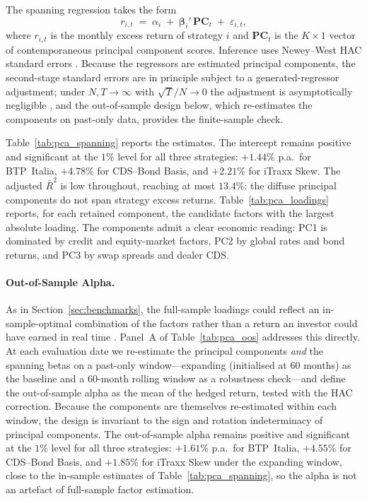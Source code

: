 The spanning regression takes the form
\[
r_{i,t} \;=\; \alpha_i \;+\; \boldsymbol{\beta}_i'\,
\mathbf{PC}_t \;+\; \varepsilon_{i,t},
\]
where $r_{i,t}$ is the monthly excess return of strategy $i$ and
$\mathbf{PC}_t$ is the $K \times 1$ vector of contemporaneous
principal component scores. Inference uses Newey--West HAC standard
errors \citep{newey1987simple}. Because the regressors are estimated
principal components, the second-stage standard errors are in
principle subject to a generated-regressor adjustment; under
$N, T \to \infty$ with $\sqrt{T}/N \to 0$ the adjustment is
asymptotically negligible \citep{bai2006confidence}, and the
out-of-sample design below, which re-estimates the components on
past-only data, provides the finite-sample check.

Table~\ref{tab:pca_spanning} reports the estimates. The intercept
remains positive and significant at the $1\%$ level for all three
strategies: $+1.44\%$ p.a.\ for BTP~Italia, $+4.78\%$ for CDS--Bond
Basis, and $+2.21\%$ for iTraxx Skew. The adjusted $\bar{R}^2$ is
low throughout, reaching at most $13.4\%$: the diffuse principal
components do not span strategy excess returns.
Table~\ref{tab:pca_loadings} reports, for each retained component, the
candidate factors with the largest absolute loading. The components
admit a clear economic reading: PC1 is dominated by credit and
equity-market factors, PC2 by global rates and bond returns, and PC3
by swap spreads and dealer CDS.

\paragraph{Out-of-Sample Alpha.}

As in Section~\ref{sec:benchmarks}, the full-sample loadings could
reflect an in-sample-optimal combination of the factors rather than a
return an investor could have earned in real time
\citep{moreira2017volatility, cederburg2020performance}. Panel~A of
Table~\ref{tab:pca_oos} addresses this directly. At each evaluation
date we re-estimate the principal components \emph{and} the spanning
betas on a past-only window---expanding (initialised at $60$ months)
as the baseline and a $60$-month rolling window as a robustness
check---and define the out-of-sample alpha as the mean of the hedged
return, tested with the \citet{newey1994automatic} HAC correction.
Because the components are themselves re-estimated within each window,
the design is invariant to the sign and rotation indeterminacy of
principal components. The out-of-sample alpha remains positive and
significant at the $1\%$ level for all three strategies: $+1.61\%$
p.a.\ for BTP~Italia, $+4.55\%$ for CDS--Bond Basis, and $+1.85\%$ for
iTraxx Skew under the expanding window, close to the in-sample
estimates of Table~\ref{tab:pca_spanning}, so the alpha is not an
artefact of full-sample factor estimation.

